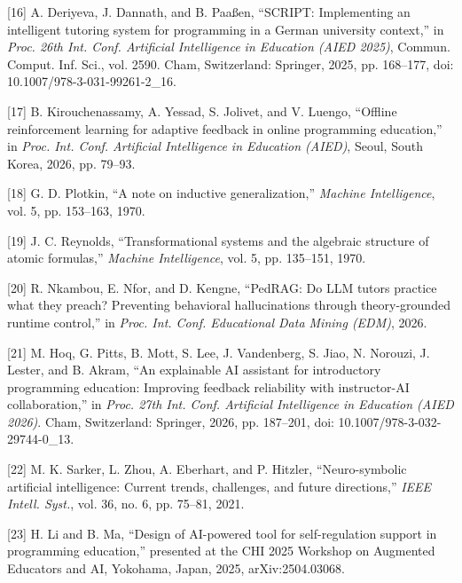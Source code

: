 \documentclass[10pt,twocolumn,letterpaper]{article}
\begin{document}
[16] A. Deriyeva, J. Dannath, and B. Paa{\ss}en, ``SCRIPT: Implementing
an intelligent tutoring system for programming in a German university
context,'' in \emph{Proc. 26th Int. Conf. Artificial Intelligence in
Education (AIED 2025)}, Commun. Comput. Inf. Sci., vol. 2590. Cham,
Switzerland: Springer, 2025, pp. 168--177, doi: 10.1007/978-3-031-99261-2\_16.

[17] B. Kirouchenassamy, A. Yessad, S. Jolivet, and V. Luengo, ``Offline
reinforcement learning for adaptive feedback in online programming
education,'' in \emph{Proc. Int. Conf. Artificial Intelligence in
Education (AIED)}, Seoul, South Korea, 2026, pp. 79--93.

[18] G. D. Plotkin, ``A note on inductive generalization,''
\emph{Machine Intelligence}, vol. 5, pp. 153--163, 1970.

[19] J. C. Reynolds, ``Transformational systems and the algebraic
structure of atomic formulas,'' \emph{Machine Intelligence}, vol. 5,
pp. 135--151, 1970.

[20] R. Nkambou, E. Nfor, and D. Kengne, ``PedRAG: Do LLM tutors
practice what they preach? Preventing behavioral hallucinations through
theory-grounded runtime control,'' in \emph{Proc. Int. Conf. Educational
Data Mining (EDM)}, 2026.

[21] M. Hoq, G. Pitts, B. Mott, S. Lee, J. Vandenberg, S. Jiao, N.
Norouzi, J. Lester, and B. Akram, ``An explainable AI assistant for
introductory programming education: Improving feedback reliability with
instructor-AI collaboration,'' in \emph{Proc. 27th Int. Conf. Artificial
Intelligence in Education (AIED 2026)}. Cham, Switzerland: Springer, 2026,
pp. 187--201, doi: 10.1007/978-3-032-29744-0\_13.

[22] M. K. Sarker, L. Zhou, A. Eberhart, and P. Hitzler,
``Neuro-symbolic artificial intelligence: Current trends, challenges, and
future directions,'' \emph{IEEE Intell. Syst.}, vol. 36, no. 6, pp.
75--81, 2021.

[23] H. Li and B. Ma, ``Design of AI-powered tool for self-regulation support
in programming education,'' presented at the CHI 2025 Workshop on Augmented
Educators and AI, Yokohama, Japan, 2025, arXiv:2504.03068.
\end{document}
